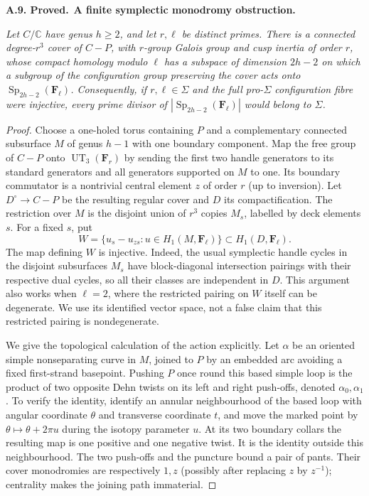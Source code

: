\documentclass[11pt,a4paper]{article}
\newcommand{\F}{\mathbf F}
\newenvironment{claim}[3]{\par\medskip\noindent\hypertarget{#1}{\textbf{#1. #2.}}\ \textbf{#3.}\par\nopagebreak\smallskip\begingroup\itshape}{\endgroup\par\smallskip}
\begin{document}
\begin{claim}{A.9}{Proved}{A finite symplectic monodromy obstruction}
Let $C/\mathbb C$ have genus $h\geq2$, and let $r,\ell$ be distinct
primes. There is a connected degree-$r^3$ cover of $C-P$, with
$r$-group Galois group and cusp inertia of order $r$, whose compact
homology modulo $\ell$ has a subspace of dimension $2h-2$ on which
a subgroup of the configuration group preserving the cover acts
onto $\operatorname{Sp}_{2h-2}(\F_\ell)$. Consequently, if $r,\ell\in\Sigma$
and the full pro-$\Sigma$ configuration fibre were injective, every
prime divisor of $|\operatorname{Sp}_{2h-2}(\F_\ell)|$ would belong
to $\Sigma$.
\end{claim}
\begin{proof}
Choose a one-holed torus containing $P$ and a complementary connected
subsurface $M$ of genus $h-1$ with one boundary component. Map the
free group of $C-P$ onto $\operatorname{UT}_3(\F_r)$ by sending
the first two handle generators to its standard generators and all
generators supported on $M$ to one. Its boundary commutator is a
nontrivial central element $z$ of order $r$ (up to inversion).
Let $D^\circ\to C-P$ be the resulting regular cover and $D$ its
compactification. The restriction over $M$ is the disjoint union of
$r^3$ copies $M_s$, labelled by deck elements $s$. For a fixed $s$,
put
\[
 W=\{u_s-u_{zs}:u\in H_1(M,\F_\ell)\}\subset H_1(D,\F_\ell).
\]
The map defining $W$ is injective. Indeed, the usual symplectic handle
cycles in the disjoint subsurfaces $M_s$ have block-diagonal
intersection pairings with their respective dual cycles, so all their
classes are independent in $D$. This argument also works when
$\ell=2$, where the restricted pairing on $W$ itself can be
 degenerate. We use its identified vector space, not a false claim
that this restricted pairing is nondegenerate.

We give the topological calculation of the action explicitly. Let
$\alpha$ be an oriented simple nonseparating curve in $M$, joined to
$P$ by an embedded arc avoiding a fixed first-strand basepoint.
Pushing $P$ once round this based simple loop is the product of two
opposite Dehn twists on its left and right push-offs, denoted
$\alpha_0,\alpha_1$. To verify the identity, identify an annular
neighbourhood of the based loop with angular coordinate $\theta$ and
transverse coordinate $t$, and move the marked point by
$\theta\mapsto\theta+2\pi u$ during the isotopy parameter $u$.
At its two boundary collars the resulting map is one positive and
one negative twist. It is the identity outside this neighbourhood.
The two push-offs and the puncture bound a pair of pants. Their
cover monodromies are respectively $1,z$ (possibly after replacing
$z$ by $z^{-1}$); centrality makes the joining path immaterial.


\end{proof}
\end{document}
